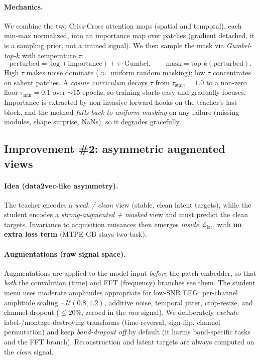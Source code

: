 \documentclass[11pt]{article}
\newcommand{\Llat}{\mathcal{L}_{\mathrm{lat}}}
\begin{document}
\paragraph{Mechanics.} We combine the two Criss-Cross attention maps (spatial and
temporal), each min-max normalized, into an importance map over patches (gradient
detached, it is a sampling prior, not a trained signal). We then sample the mask
via \emph{Gumbel-top-\(k\)} with temperature \(\tau\):
\begin{equation}
\text{perturbed} = \log(\text{importance}) + \tau\cdot\text{Gumbel}, \qquad
\text{mask} = \text{top-}k(\text{perturbed}).
\end{equation}
High \(\tau\) makes noise dominate (\(\approx\) uniform random masking); low
\(\tau\) concentrates on salient patches. A \emph{cosine curriculum} decays
\(\tau\) from \(\tau_{\text{start}}{=}1.0\) to a non-zero floor
\(\tau_{\text{min}}{=}0.1\) over \(\sim\!15\) epochs, so training starts easy and
gradually focuses. Importance is extracted by non-invasive forward-hooks on the
teacher's last block, and the method \emph{falls back to uniform masking} on any
failure (missing modules, shape surprise, NaNs), so it degrades gracefully.

\subsection{Improvement \#2: asymmetric augmented views}
\paragraph{Idea (data2vec-like asymmetry).} The teacher encodes a \emph{weak /
clean} view (stable, clean latent targets), while the student encodes a
\emph{strong-augmented + masked} view and must predict the clean targets.
Invariance to acquisition nuisances then emerges \emph{inside} \(\Llat\), with
\textbf{no extra loss term} (MTPE-GB stays two-task).

\paragraph{Augmentations (raw signal space).} Augmentations are applied to the
model input \emph{before} the patch embedder, so that \emph{both} the convolution
(time) and FFT (frequency) branches see them. The student menu uses moderate
amplitudes appropriate for low-SNR EEG: per-channel amplitude scaling
\(\sim\mathcal{U}(0.8,1.2)\), additive noise, temporal jitter, crop-resize, and
channel-dropout (\(\le\!20\%\), zeroed in the \emph{raw} signal). We deliberately
\emph{exclude} label-/montage-destroying transforms (time-reversal, sign-flip,
channel permutation) and keep \emph{band-dropout off} by default (it harms
band-specific tasks and the FFT branch). Reconstruction and latent targets are
always computed on the \emph{clean} signal.
\end{document}
